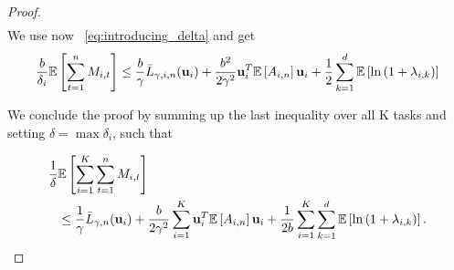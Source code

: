 \begin{proof}
\begin{equation*}
\begin{split}
\end{split}
\end{equation*} 
We use now ~\eqref{eq:introducing_delta} and get
\begin{equation*}
  \begin{split}
   \frac{b}{\delta_i}\mathbb{E}\left[{\sum_{t=1}^{n}{M_{i,t}}}\right]
   \le \frac{b}{\gamma}{\bar L}_{\gamma,i,n}(\mathbf{u}_{i})
+ \frac{b^2}{2\gamma^2}\mathbf{u}_i^T\mathbb{E}\left[{A_{i,n}}\right]\mathbf{u}_i+ \frac{1}{2}\sum_{k=1}^{d}\mathbb{E}\left[{\ln\left({1+\lambda_{i,k}}\right)}\right]
\end{split}
\end{equation*} 

We conclude the proof by summing up the last inequality over all K tasks and setting $\delta = \max{\delta_i}$, 
such that 

\begin{equation*}
  \begin{split}
   \frac{1}{\delta}&\mathbb{E}\left[{\sum_{i=1}^{K}\sum_{t=1}^{n}{M_{i,t}}}\right] \\
   &\le \frac{1}{\gamma}{\bar L}_{\gamma,n}(\mathbf{u}_{i})
+ \frac{b}{2\gamma^2}\sum_{i=1}^{K}\mathbf{u}_i^T\mathbb{E}\left[{A_{i,n}}\right]\mathbf{u}_i+ 
\frac{1}{2b}\sum_{i=1}^{K}\sum_{k=1}^{d}\mathbb{E}\left[{\ln\left({1+\lambda_{i,k}}\right)}\right].
\end{split}
\end{equation*} 
\end{proof}











